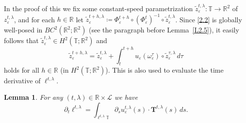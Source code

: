 \documentclass[reqno,centertags,12pt]{amsart}
\newtheorem{lemma}[theorem]{Lemma}
\theoremstyle{definition}
\numberwithin{equation}{section}
\newcommand{\bbR}{{\mathbb{R}}}
\newcommand{\bbT}{{\mathbb{T}}}
\newcommand{\eps}{\varepsilon}
\begin{document}
In the proof of this we fix
some constant-speed parametrization
$\tilde{z}_{\eps}^{t,\lambda}\colon\bbT\to\bbR^{2}$ of $z_{\eps}^{t,\lambda}$, and for each $h\in\bbR$
let $\tilde{z}_{\eps}^{t+h,\lambda}\coloneqq
\Phi_{\eps}^{t+h}\circ(\Phi_{\eps}^{t})^{-1}\circ\tilde{z}_{\eps}^{t,\lambda}$. Since \eqref{2.2} is globally well-posed
in $BC^{2}(\bbR^{2};\bbR^{2})$ (see the paragraph before Lemma~\ref{L2.5}),
it easily follows that $\tilde{z}_{\eps}^{t,\lambda}\in H^{2}(\bbT;\bbR^{2})$ and
\begin{equation}\label{3.1}
    \tilde{z}_{\eps}^{t+h,\lambda}
    = \tilde{z}_{\eps}^{t,\lambda} + \int_{t}^{t+h}u_{\eps}(\omega_{\eps}^{\tau})
    \circ \tilde{z}_{\eps}^{\tau,\lambda}\,d\tau
\end{equation}
holds for all $h\in\bbR$ (in $H^{2}(\bbT;\bbR^{2})$).  This is also used to evaluate the time derivative of $\ell^{t,\lambda}$.

\begin{lemma}\label{L3.1}
    For any $(t,\lambda)\in\bbR\times\mathcal{L}$ we have
    \[
        \partial_{t}\ell^{t,\lambda}
        = \int_{\ell^{t,\lambda}\bbT}
        \partial_{s}u_{\eps}^{t,\lambda}(s)\cdot\mathbf{T}^{t,\lambda}(s)\,ds.
    \]
\end{lemma}
\end{document}
